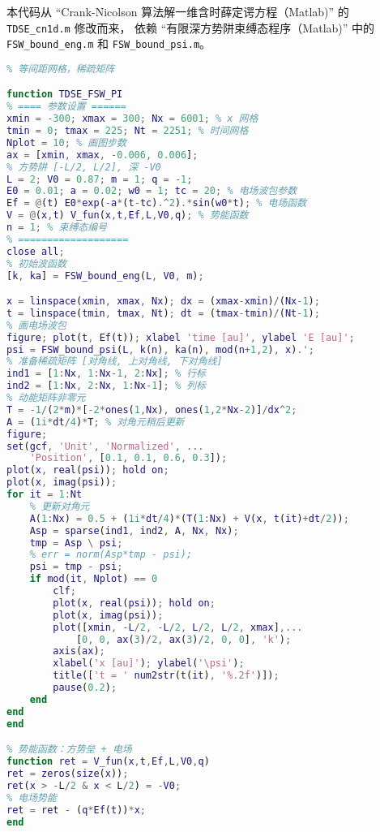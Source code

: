 本代码从 “Crank-Nicolson 算法解一维含时薛定谔方程（Matlab)” 的 \verb|TDSE_cn1d.m| 修改而来， 依赖 “有限深方势阱束缚态程序（Matlab)” 中的 \verb|FSW_bound_eng.m| 和 \verb|FSW_bound_psi.m|。
\begin{lstlisting}[language=matlab, caption=TDSE\_FSW\_PI.m]
% 一维有限深方势阱中的光电离模拟
% 等间距网格，稀疏矩阵

function TDSE_FSW_PI
% ==== 参数设置 ======
xmin = -300; xmax = 300; Nx = 6001; % x 网格
tmin = 0; tmax = 225; Nt = 2251; % 时间网格
Nplot = 10; % 画图步数
ax = [xmin, xmax, -0.006, 0.006];
% 方势阱 [-L/2, L/2], 深 -V0
L = 2; V0 = 0.87; m = 1; q = -1;
E0 = 0.01; a = 0.02; w0 = 1; tc = 20; % 电场波包参数
Ef = @(t) E0*exp(-a*(t-tc).^2).*sin(w0*t); % 电场函数
V = @(x,t) V_fun(x,t,Ef,L,V0,q); % 势能函数
n = 1; % 束缚态编号
% ===================
close all;
% 初始波函数
[k, ka] = FSW_bound_eng(L, V0, m);

x = linspace(xmin, xmax, Nx); dx = (xmax-xmin)/(Nx-1);
t = linspace(tmin, tmax, Nt); dt = (tmax-tmin)/(Nt-1);
% 画电场波包
figure; plot(t, Ef(t)); xlabel 'time [au]', ylabel 'E [au]';
psi = FSW_bound_psi(L, k(n), ka(n), mod(n+1,2), x).';
% 准备稀疏矩阵 [对角线, 上对角线, 下对角线]
ind1 = [1:Nx, 1:Nx-1, 2:Nx]; % 行标
ind2 = [1:Nx, 2:Nx, 1:Nx-1]; % 列标
% 动能矩阵非零元
T = -1/(2*m)*[-2*ones(1,Nx), ones(1,2*Nx-2)]/dx^2;
A = (1i*dt/4)*T; % 对角元稍后更新
figure;
set(gcf, 'Unit', 'Normalized', ...
    'Position', [0.1, 0.1, 0.6, 0.3]);
plot(x, real(psi)); hold on;
plot(x, imag(psi));
for it = 1:Nt
    % 更新对角元
    A(1:Nx) = 0.5 + (1i*dt/4)*(T(1:Nx) + V(x, t(it)+dt/2));
    Asp = sparse(ind1, ind2, A, Nx, Nx);
    tmp = Asp \ psi;
    % err = norm(Asp*tmp - psi);
    psi = tmp - psi;
    if mod(it, Nplot) == 0
        clf;
        plot(x, real(psi)); hold on;
        plot(x, imag(psi));
        plot([xmin, -L/2, -L/2, L/2, L/2, xmax],...
            [0, 0, ax(3)/2, ax(3)/2, 0, 0], 'k');
        axis(ax);
        xlabel('x [au]'); ylabel('\psi');
        title(['t = ' num2str(t(it), '%.2f')]);
        pause(0.2);
    end
end
end

% 势能函数：方势垒 + 电场
function ret = V_fun(x,t,Ef,L,V0,q)
ret = zeros(size(x));
ret(x > -L/2 & x < L/2) = -V0;
% 电场势能
ret = ret - (q*Ef(t))*x;
end
\end{lstlisting}

